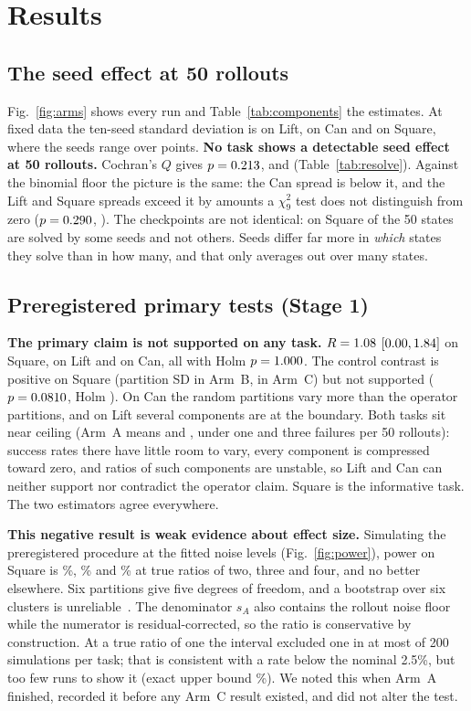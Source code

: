 \IfFileExists{IEEEtran.cls}{\documentclass[journal]{IEEEtran}}{\documentclass[10pt,twocolumn]{article}}
\begin{document}
\section{Results}
\subsection{The seed effect at 50 rollouts}
\label{sec:floor}
Fig.~\ref{fig:arms} shows every run and Table~\ref{tab:components} the estimates. At fixed data the ten-seed standard deviation is \OneLiftASD{} on Lift, \OneCanASD{} on Can and \OneSqASD{} on Square, where the seeds range over \OneSqARange{} points. \textbf{No task shows a detectable seed effect at 50 rollouts.} Cochran's $Q$ gives $p=0.213$, \OneCanCochP{} and \OneSqCochP{} (Table~\ref{tab:resolve}). Against the binomial floor the picture is the same: the Can spread is below it, and the Lift and Square spreads exceed it by amounts a $\chi^2_9$ test does not distinguish from zero ($p=0.290$, \OneSqChiBp). The checkpoints are not identical: on Square \OneSqDiscrim{} of the 50 states are solved by some seeds and not others. Seeds differ far more in \emph{which} states they solve than in how many, and that only averages out over many states.

\subsection{Preregistered primary tests (Stage 1)}
\label{sec:primary}
\textbf{The primary claim is not supported on any task.} $R=1.08$ $[0.00, 1.84]$ on Square, \OneLiftR{} on Lift and \OneCanR{} on Can, all with Holm $p=1.000$. The control contrast is positive on Square (partition SD \OneSqBSDp{} in Arm~B, \OneSqCSDp{} in Arm~C) but not supported ($p=0.0810$, Holm \OneSqDpHolm). On Can the random partitions vary more than the operator partitions, and on Lift several components are at the boundary. Both tasks sit near ceiling (Arm~A means \OneLiftAMean{} and \OneCanAMean, under one and three failures per 50 rollouts): success rates there have little room to vary, every component is compressed toward zero, and ratios of such components are unstable, so Lift and Can can neither support nor contradict the operator claim. Square is the informative task. The two estimators agree everywhere.

\textbf{This negative result is weak evidence about effect size.} Simulating the preregistered procedure at the fitted noise levels (Fig.~\ref{fig:power}), power on Square is \OneSqPowTwo\%, \OneSqPowThree\% and \OneSqPowFour\% at true ratios of two, three and four, and no better elsewhere. Six partitions give five degrees of freedom, and a bootstrap over six clusters is unreliable~\cite{cameron2008bootstrap}. The denominator $s_A$ also contains the rollout noise floor while the numerator is residual-corrected, so the ratio is conservative by construction. At a true ratio of one the interval excluded one in at most \FPmaxCount{} of 200 simulations per task; that is consistent with a rate below the nominal 2.5\%, but too few runs to show it (exact upper bound \FPupper\%). We noted this when Arm~A finished, recorded it before any Arm~C result existed, and did not alter the test.
\end{document}
